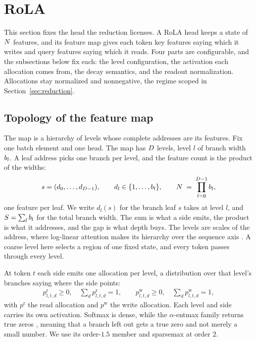 \section{RoLA}
\label{sec:rola}

This section fixes the head the reduction licenses. A RoLA head keeps a state of $N$ features, and its feature map gives each token key features saying which it writes and query features saying which it reads. Four parts are configurable, and the subsections below fix each: the level configuration, the activation each allocation comes from, the decay semantics, and the readout normalization. Allocations stay normalized and nonnegative, the regime scoped in Section~\ref{sec:reduction}.

\subsection{Topology of the feature map}
\label{sec:topology}

The map is a hierarchy of levels whose complete addresses are its features. Fix one batch element and one head. The map has $D$ levels, level $l$ of branch width $b_l$. A leaf address picks one branch per level, and the feature count is the product of the widths:
\begin{align}
  s = (d_0, \dots, d_{D-1}), \qquad d_l \in \{1,\dots,b_l\},
  \qquad N \;=\; \prod_{l=0}^{D-1} b_l ,
  \label{eq:leafcount}
\end{align}
one feature per leaf. We write $d_l(s)$ for the branch leaf $s$ takes at level $l$, and $S = \sum_l b_l$ for the total branch width. The sum is what a side emits, the product is what it addresses, and the gap is what depth buys. The levels are scales of the address, where log-linear attention makes its hierarchy over the sequence axis \citep{guo2025loglinear}. A coarse level here selects a region of one fixed state, and every token passes through every level.

At token $t$ each side emits one allocation per level, a distribution over that level's branches saying where the side points:
\begin{align}
  p^{\mathrm{r}}_{l,t,d} \ge 0,\quad \textstyle\sum_d p^{\mathrm{r}}_{l,t,d} = 1,
  \qquad
  p^{\mathrm{w}}_{l,t,d} \ge 0,\quad \textstyle\sum_d p^{\mathrm{w}}_{l,t,d} = 1,
  \label{eq:levelalloc}
\end{align}
with $p^{\mathrm{r}}$ the read allocation and $p^{\mathrm{w}}$ the write allocation. Each level and side carries its own activation. Softmax is dense, while the $\alpha$-entmax family returns true zeros \citep{peters2019sparse, martins2016sparsemax}, meaning that a branch left out gets a true zero and not merely a small number. We use its order-$1.5$ member and sparsemax at order $2$.


